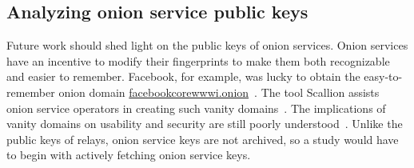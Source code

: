\subsection{Analyzing onion service public keys}
Future work should shed light on the public keys of onion services.  Onion
services have an incentive to modify their fingerprints to make them both
recognizable and easier to remember.  Facebook, for example, was lucky to
obtain the easy-to-remember onion domain
\url{facebookcorewwwi.onion}~\cite{facebook}.  The tool Scallion assists onion
service operators in creating such vanity domains~\cite{scallion}.  The
implications of vanity domains on usability and security are still poorly
understood~\cite{vanity-domains}.  Unlike the public keys of relays, onion
service keys are not archived, so a study would have to begin with actively
fetching onion service keys.


